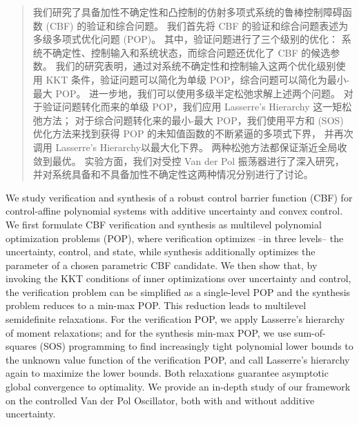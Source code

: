 

\begin{abstract}
  我们研究了具备加性不确定性和凸控制的仿射多项式系统的鲁棒控制障碍函数 (CBF) 的验证和综合问题。
  我们首先将 CBF 的验证和综合问题表述为多级多项式优化问题 (POP)。
  其中，验证问题进行了三个级别的优化：
  系统不确定性、控制输入和系统状态，而综合问题还优化了 CBF 的候选参数。
  我们的研究表明，通过对系统不确定性和控制输入这两个优化级别使用 KKT 条件，验证问题可以简化为单级 POP，综合问题可以简化为最小-最大 POP。
  进一步地，我们可以使用多级半定松弛求解上述两个问题。
  对于验证问题转化而来的单级 POP，我们应用 Lasserre's Hierarchy 这一矩松弛方法；
  对于综合问题转化来的最小-最大 POP，我们使用平方和 (SOS) 优化方法来找到获得 POP 的未知值函数的不断紧逼的多项式下界，
  并再次调用 Lasserre's Hierarchy以最大化下界。
  两种松弛方法都保证渐近全局收敛到最优。
  实验方面，我们对受控 Van der Pol 振荡器进行了深入研究，并对系统具备和不具备加性不确定性这两种情况分别进行了讨论。

\end{abstract}

\begin{abstract*}
  We study verification and synthesis of a 
  robust control barrier function (CBF) for control-affine polynomial systems with additive uncertainty and convex control. 
  We first formulate CBF verification and synthesis as multilevel polynomial optimization problems (POP), where verification  optimizes --in three levels-- 
  the uncertainty, control, and state, while synthesis additionally optimizes the parameter of a chosen parametric CBF candidate. 
  We then show that, by invoking the KKT conditions of inner optimizations over uncertainty and control, the verification problem can be simplified as a single-level POP and the synthesis problem reduces to a min-max POP. 
  This reduction leads to multilevel semidefinite relaxations. 
  For the verification POP, we apply Lasserre's hierarchy of moment relaxations; 
  and for the synthesis min-max POP, we use sum-of-squares (SOS) programming to find increasingly tight polynomial lower bounds to the unknown value function of the verification POP, 
  and call Lasserre's hierarchy again to maximize the lower bounds. 
  Both relaxations guarantee asymptotic global convergence to optimality. 
  We provide an in-depth study of our framework on the controlled Van der Pol Oscillator, both with and without additive uncertainty.

\end{abstract*}
